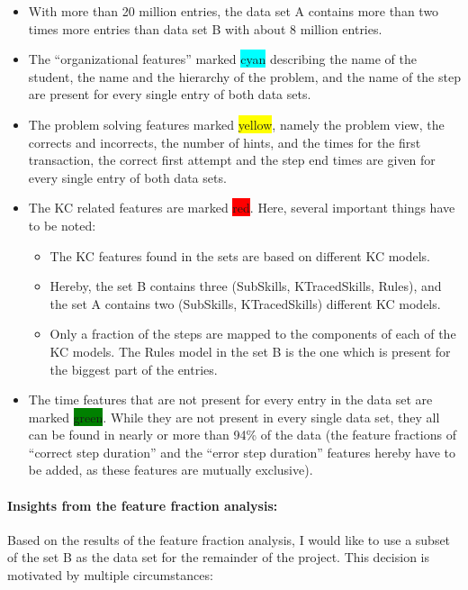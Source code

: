 \begin{itemize}
	\item With more than 20 million entries, the data set A contains more than two times more entries than data set B with about 8 million entries.
	\item The “organizational features” marked \colorbox{cyan}{cyan} describing the name of the student, the name and the hierarchy of the problem, and the name of the step are present for every single entry of both data sets.
	\item The problem solving features marked \colorbox{yellow}{yellow}, namely the problem view, the corrects and incorrects, the number of hints, and the times for the first transaction, the correct first attempt and the step end times are given for every single entry of both data sets.
	\item The KC related features are marked \colorbox{red}{red}. Here, several important things have to be noted:
	\begin{itemize}
		\item The KC features found in the sets are based on different KC models.
		\item Hereby, the set B contains three (SubSkills, KTracedSkills, Rules), and the set A contains two (SubSkills, KTracedSkills) different KC models.
		\item Only a fraction of the steps are mapped to the components of each of the KC models. The Rules model in the set B is the one which is present for the biggest part of the entries.
	\end{itemize}
	\item The time features that are not present for every entry in the data set are marked \colorbox{green}{green}. While they are not present in every single data set, they all can be found in nearly or more than 94\% of the data (the feature fractions of “correct step duration” and the “error step duration” features hereby have to be added, as these features are mutually exclusive).
\end{itemize}

\paragraph{Insights from the feature fraction analysis:}

Based on the results of the feature fraction analysis, I would like to use a subset of the set B as the data set for the remainder of the project. This decision is motivated by multiple circumstances:

